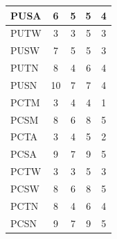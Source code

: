 \documentclass{svjour3}
\theoremstyle{break}
\begin{document}
\begin{table}
\begin{center}
{{{\begin{tabular}{l@{~~~}|c@{~~~}c@{~~~}c@{~~~}c}
PUSA & 6 & 5 & 5 & 4\\
\hline
PUTW &\cellcolor{green!40} 3 & \cellcolor{green!40}3 & 5 & 3\\
PUSW & 7 & 5 & 5 & 3\\
\hline
PUTN & \cellcolor{green!40}8 &\cellcolor{green!40} 4 &\cellcolor{green!40} 6 & 4\\
PUSN & 10 & 7 & 7 & 4\\
\hline
PCTM & \cellcolor{green!40}3 &\cellcolor{green!40} 4 &\cellcolor{green!40} 4 &\cellcolor{green!40} 1\\
PCSM & 8 & 6 & 8 & 5\\
\hline
PCTA & \cellcolor{green!40}3 &\cellcolor{green!40} 4 & \cellcolor{green!40}5 &\cellcolor{green!40} 2\\
PCSA & 9 & 7 & 9 & 5\\
\hline
PCTW & \cellcolor{green!40}3 &\cellcolor{green!40} 3 &\cellcolor{green!40} 5 &\cellcolor{green!40} 3\\
PCSW & 8 & 6 & 8 & 5\\
\hline
PCTN & \cellcolor{green!40}8 &\cellcolor{green!40} 4 & \cellcolor{green!40}6 & \cellcolor{green!40}4\\
PCSN & 9 & 7 & 9 & 5\\
\hline
\end{tabular}}
}}
\parbox{.49\linewidth}{
\centering
{}}
\end{center}
\end{table}
\end{document}
